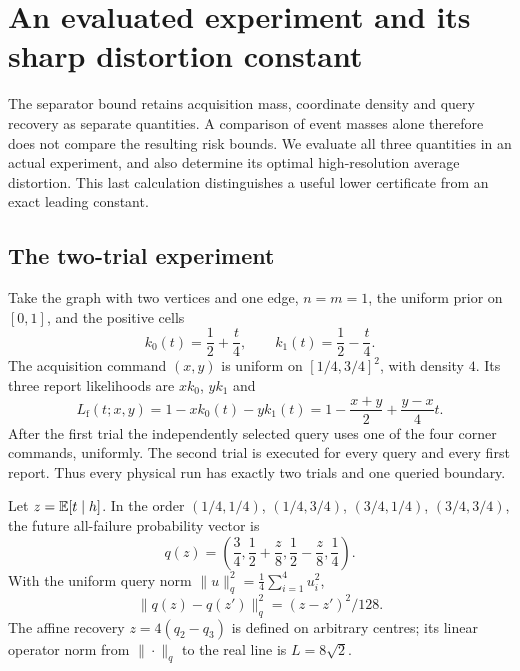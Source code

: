 \section{An evaluated experiment and its sharp distortion constant}
\label{sec:v27-evaluated}
The separator bound retains acquisition mass, coordinate density and query recovery as separate quantities. A comparison of event masses alone therefore does not compare the resulting risk bounds. We evaluate all three quantities in an actual experiment, and also determine its optimal high-resolution average distortion. This last calculation distinguishes a useful lower certificate from an exact leading constant.

\subsection{The two-trial experiment}
Take the graph with two vertices and one edge, $n=m=1$, the uniform prior on $[0,1]$, and the positive cells
\[
                 k_0(t)=\frac12+\frac t4,\qquad
                 k_1(t)=\frac12-\frac t4.
\]
The acquisition command $(x,y)$ is uniform on $[1/4,3/4]^2$, with density $4$. Its three report likelihoods are $xk_0$, $yk_1$ and
\[
 L_{\mathrm f}(t;x,y)=1-xk_0(t)-yk_1(t)
                  =1-\frac{x+y}{2}+\frac{y-x}{4}t.
\]
After the first trial the independently selected query uses one of the four corner commands, uniformly. The second trial is executed for every query and every first report. Thus every physical run has exactly two trials and one queried boundary.

Let $z=\mathbb E[t\mid h]$. In the order $(1/4,1/4)$, $(1/4,3/4)$, $(3/4,1/4)$, $(3/4,3/4)$, the future all-failure probability vector is
\begin{equation}\label{eq:v27-query-line}
            q(z)=\left(\frac34,\frac12+\frac z8,
                                  \frac12-\frac z8,\frac14\right).
\end{equation}
With the uniform query norm $\|u\|_q^2=\tfrac14\sum_{i=1}^4u_i^2$,
\begin{equation}\label{eq:v27-query-isometry}
               \|q(z)-q(z')\|_q^2=(z-z')^2/128.
\end{equation}
The affine recovery $z=4(q_2-q_3)$ is defined on arbitrary centres; its linear operator norm from $\|\cdot\|_q$ to the real line is $L=8\sqrt2$.

